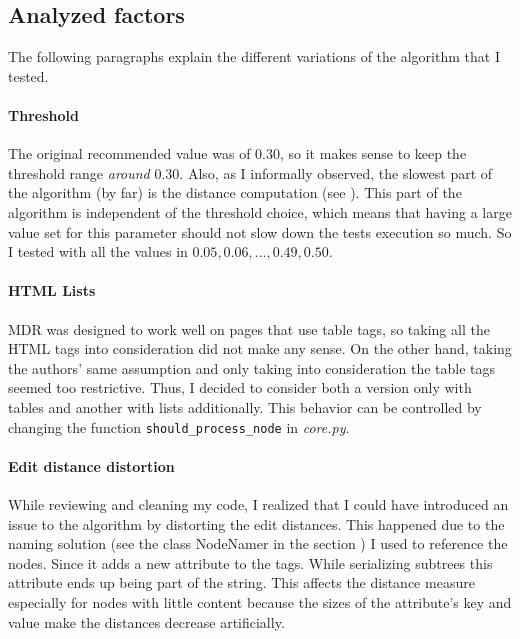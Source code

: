 \documentclass[10pt]{article}
\newcommand{\code}[1]{\colorbox{codegray}{\texttt{#1}}}
\begin{document}
\subsection{Analyzed factors}

The following paragraphs explain the different variations of the algorithm that I tested.


\paragraph{Threshold}

The original recommended value was of $0.30$, so it makes sense to keep the threshold range \emph{around} $0.30$. Also, as I informally observed, the slowest part of the algorithm (by far) is the distance computation (see ). This part of the algorithm is independent of the threshold choice, which means that having a large value set for this parameter should not slow down the tests execution so much. So I tested with all the values in ${0.05, 0.06, ..., 0.49, 0.50}$.

\paragraph{HTML Lists} 

MDR was designed to work well on pages that use table tags, so taking all the HTML tags into consideration did not make any sense. On the other hand, taking the authors' same assumption and only taking into consideration the table tags seemed too restrictive. Thus, I decided to consider both a version only with tables and another with lists additionally. This behavior can be controlled by changing the function \code{should\_process\_node} in \emph{core.py}.

\paragraph{Edit distance distortion}

While reviewing and cleaning my code, I realized that I could have introduced an issue to the algorithm by distorting the edit distances. This happened due to the naming solution (see the class NodeNamer in the section ) I used to reference the nodes. Since it adds a new attribute to the tags. While serializing subtrees this attribute ends up being part of the string. This affects the distance measure especially for nodes with little content because the sizes of the attribute's key and value make the distances decrease artificially. 
\end{document}
